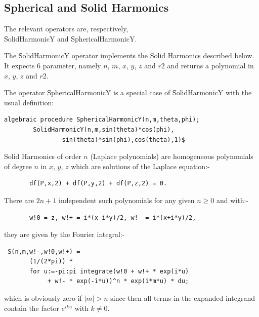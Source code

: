 \subsection{Spherical and Solid Harmonics}
\hypertarget{operator:SPHERICALHARMONICY}{}
\hypertarget{operator:SOLIDHARMONICY}{}
\hypertarget{SPHSOLH}{}

The relevant operators are, respectively,\\
\f{SolidHarmonicY} and \f{SphericalHarmonicY}.

The \f{SolidHarmonicY} operator implements the Solid Harmonics
described below. It expects 6 parameter, namely $n$, $m$, $x$, $y$, $z$ and $r2$
and returns a polynomial in $x$, $y$, $z$ and $r2$.

The operator
\f{SphericalHarmonicY} is a special case of \f{SolidHarmonicY}
with the usual definition:

\begin{verbatim}
algebraic procedure SphericalHarmonicY(n,m,theta,phi);
        SolidHarmonicY(n,m,sin(theta)*cos(phi),
                sin(theta)*sin(phi),cos(theta),1)$
\end{verbatim}


Solid Harmonics of order $n$ (Laplace polynomials)
are homogeneous polynomials of degree $n$ in $x$, $y$, $z$
which are solutions of the Laplace equation:-

\begin{verbatim}
       df(P,x,2) + df(P,y,2) + df(P,z,2) = 0.
\end{verbatim}

There are $2n+1$ independent such polynomials for any given $n \geq 0$
and with:-

\begin{verbatim}
       w!0 = z, w!+ = i*(x-i*y)/2, w!- = i*(x+i*y)/2,
\end{verbatim}

they are given by the Fourier integral:-

\begin{verbatim}
 S(n,m,w!-,w!0,w!+) =
       (1/(2*pi)) *
       for u:=-pi:pi integrate(w!0 + w!+ * exp(i*u)
            + w!- * exp(-i*u))^n * exp(i*m*u) * du;
\end{verbatim}

which is obviously zero if $|m| > n$ since then all terms in the
expanded integrand contain the factor $e^{iku}$ with $k \neq 0$.

